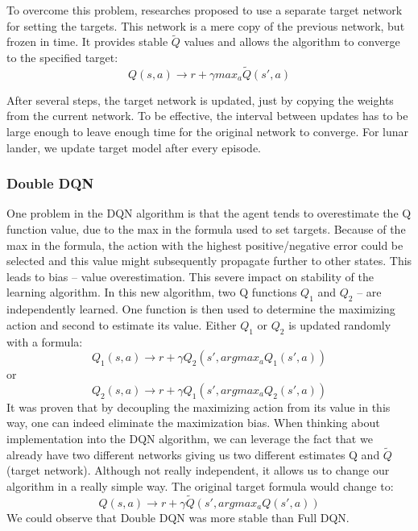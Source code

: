 To overcome this problem, researches proposed to use a separate target network for setting the targets. This network is a mere copy of the previous network, but frozen in time. It provides stable $\tilde{Q}$ values and allows the algorithm to converge to the specified target:
\begin{equation}
Q(s, a) \xrightarrow{} r + \gamma max_a \tilde{Q}(s', a)
\end{equation}

After several steps, the target network is updated, just by copying the weights from the current network. To be effective, the interval between updates has to be large enough to leave enough time for the original network to converge. \newline
For lunar lander, we update target model after every episode.

\subsubsection{Double DQN}
One problem in the DQN algorithm is that the agent tends to overestimate the Q function value, due to the max in the formula used to set targets.
Because of the max in the formula, the action with the highest positive/negative error could be selected and this value might subsequently propagate further to other states. This leads to bias – value overestimation. This severe impact on stability of the learning algorithm.
\newline
In this new algorithm, two Q functions $Q_{1}$ and $Q_2$ – are independently learned. One function is then used to determine the maximizing action and second to estimate its value. Either $Q_1$ or $Q_2$ is updated randomly with a formula:
\begin{equation}
Q_1(s, a) \xrightarrow{} r + \gamma Q_2(s', argmax_a Q_1(s', a)) 
\end{equation}
or
\begin{equation}
Q_2(s, a) \xrightarrow{} r + \gamma Q_1(s', argmax_a Q_2(s', a)) 
\end{equation}
It was proven that by decoupling the maximizing action from its value in this way, one can indeed eliminate the maximization bias.
\newline
When thinking about implementation into the DQN algorithm, we can leverage the fact that we already have two different networks giving us two different estimates Q and $\tilde{Q}$ (target network). Although not really independent, it allows us to change our algorithm in a really simple way.
\newline
The original target formula would change to:
\begin{equation}
Q(s, a) \xrightarrow{} r + \gamma \tilde{Q}(s', argmax_a Q(s', a))
\end{equation}
We could observe that Double DQN was more stable than Full DQN.
 
